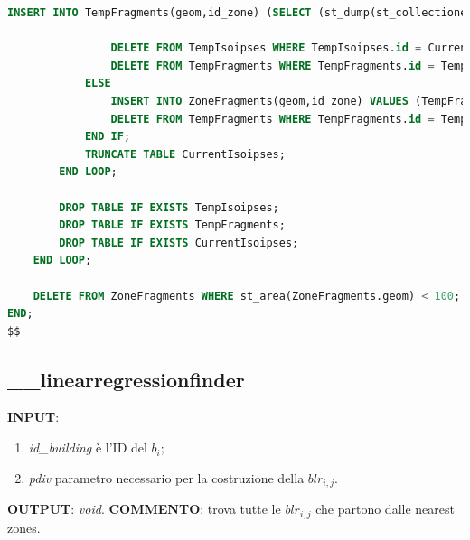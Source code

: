 \begin{lstlisting}[language=SQL]
				INSERT INTO TempFragments(geom,id_zone) (SELECT (st_dump(st_collectionextract(st_split(TempFragment.geom,CurrentIsoipse.geom),3))).geom, zoneCorrente.id);
				
				DELETE FROM TempIsoipses WHERE TempIsoipses.id = CurrentIsoipse.id;
				DELETE FROM TempFragments WHERE TempFragments.id = TempFragment.id;
			ELSE
				INSERT INTO ZoneFragments(geom,id_zone) VALUES (TempFragment.geom,TempFragment.id_zone);
				DELETE FROM TempFragments WHERE TempFragments.id = TempFragment.id;
			END IF;
			TRUNCATE TABLE CurrentIsoipses;
		END LOOP;

		DROP TABLE IF EXISTS TempIsoipses;
		DROP TABLE IF EXISTS TempFragments;
		DROP TABLE IF EXISTS CurrentIsoipses;	
	END LOOP;

	DELETE FROM ZoneFragments WHERE st_area(ZoneFragments.geom) < 100;
END;
$$
\end{lstlisting}

\subsection{\_\_linearregressionfinder}
\textbf{INPUT}: 
\begin{enumerate}
	\item \textit{id\_building} è l'ID del $b_i$;
	\item \textit{pdiv} parametro necessario per la costruzione della $blr_{i,j}$.
\end{enumerate}
\textbf{OUTPUT}: \textit{void}. \newline
\textbf{COMMENTO}: trova tutte le $blr_{i,j}$ che partono dalle nearest zones.

